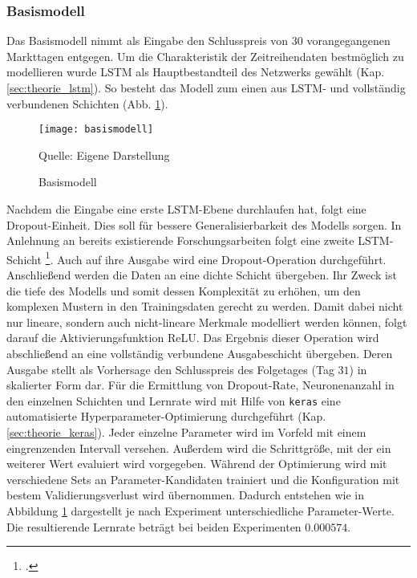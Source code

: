 \subsubsection{Basismodell}\label{sec:modellierung_basis_goog}

Das Basismodell nimmt als Eingabe den Schlusspreis von $30$ vorangegangenen Markttagen entgegen. Um die Charakteristik der Zeitreihendaten bestmöglich zu modellieren wurde \ac{LSTM} als Hauptbestandteil des Netzwerks gewählt (Kap. \ref{sec:theorie_lstm}). So besteht das Modell zum einen aus LSTM- und vollständig verbundenen Schichten (Abb. \ref{fig:basismodell}). 
\begin{figure}[H]
	\centering
	\caption{Basismodell}
	\texttt{[image: basismodell]}
	\label{fig:basismodell}
	\vspace{-1.0em}
	\begin{flushleft}
		\small{Quelle: Eigene Darstellung}
	\end{flushleft}
\end{figure}
Nachdem die Eingabe eine erste \ac{LSTM}-Ebene durchlaufen hat, folgt eine Dropout-Einheit. Dies soll für bessere Generalisierbarkeit des Modells sorgen. In Anlehnung an bereits existierende Forschungsarbeiten folgt eine zweite \ac{LSTM}-Schicht \footcite[Kap. 4.2.1]{guan2020stockprice}. Auch auf ihre Ausgabe wird eine Dropout-Operation durchgeführt. Anschließend werden die Daten an eine dichte Schicht übergeben. Ihr Zweck ist die tiefe des Modells und somit dessen Komplexität zu erhöhen, um den komplexen Mustern in den Trainingsdaten gerecht zu werden. Damit dabei nicht nur lineare, sondern auch nicht-lineare Merkmale modelliert werden können, folgt darauf die Aktivierungsfunktion \ac{ReLU}. Das Ergebnis dieser Operation wird abschließend an eine vollständig verbundene Ausgabeschicht übergeben. Deren Ausgabe stellt als Vorhersage den Schlusspreis des Folgetages (Tag $31$) in skalierter Form dar.
Für die Ermittlung von Dropout-Rate, Neuronenanzahl in den einzelnen Schichten und Lernrate wird mit Hilfe von \texttt{keras} eine automatisierte Hyperparameter-Optimierung durchgeführt (Kap. \ref{sec:theorie_keras}). Jeder einzelne Parameter wird im Vorfeld mit einem eingrenzenden Intervall versehen. Außerdem wird die Schrittgröße, mit der ein weiterer Wert evaluiert wird vorgegeben. Während der Optimierung wird mit verschiedene Sets an Parameter-Kandidaten trainiert und die Konfiguration mit bestem Validierungsverlust wird übernommen. Dadurch entstehen wie in Abbildung \ref{fig:basismodell} dargestellt je nach Experiment unterschiedliche Parameter-Werte. Die resultierende Lernrate beträgt bei beiden Experimenten $0.000574$.



